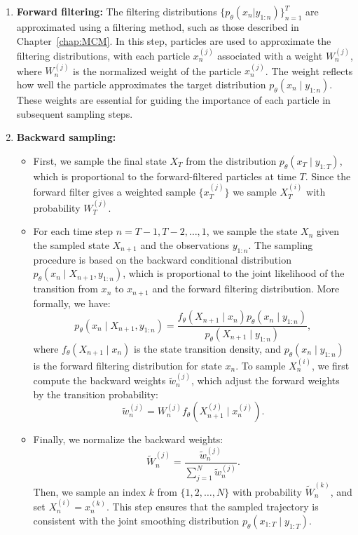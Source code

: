 \begin{enumerate}
	\item \textbf{Forward filtering:} The filtering distributions \(\{p_\theta(x_n \vert y_{1:n})\}_{n=1}^{T}\) are approximated using a filtering method, such as those described in Chapter~\ref{chap:MCM}. In this step, particles are used to approximate the filtering distributions, with each particle \(x_n^{(j)}\) associated with a weight \(W_n^{(j)}\), where \(W_n^{(j)}\) is the normalized weight of the particle \(x_n^{(j)}\). The weight reflects how well the particle approximates the target distribution \(p_\theta(x_n \mid y_{1:n})\). These weights are essential for guiding the importance of each particle in subsequent sampling steps.
	
	\item \textbf{Backward sampling:} 
	\begin{itemize}
		\item First, we sample the final state \( X_T \) from the distribution \( p_\theta(x_T \mid y_{1:T}) \), which is proportional to the forward-filtered particles at time \(T\). Since the forward filter gives a weighted sample \( \{ x_T^{(j)} \} \) we sample $X_T^{(i)}$ with probability \( W_T^{(j)} \). 
		
		\item For each time step \( n=T-1,T-2,\dots,1 \), we sample the state \( X_n \) given the sampled state \( X_{n+1} \) and the observations \( y_{1:n} \). The sampling procedure is based on the backward conditional distribution \( p_\theta(x_n \mid X_{n+1}, y_{1:n}) \), which is proportional to the joint likelihood of the transition from \( x_n \) to \( x_{n+1} \) and the forward filtering distribution. More formally, we have:
		\[
		p_\theta(x_n \mid X_{n+1}, y_{1:n}) = \frac{ f_\theta(X_{n+1} \mid x_n) p_\theta(x_n \mid y_{1:n}) }{ p_\theta(X_{n+1} \mid y_{1:n}) },
		\]
		where \( f_\theta(X_{n+1} \mid x_n) \) is the state transition density, and \( p_\theta(x_n \mid y_{1:n}) \) is the forward filtering distribution for state \( x_n \). To sample \( X_n^{(i)} \), we first compute the backward weights \( \tilde{w}_n^{(j)} \), which adjust the forward weights by the transition probability:
		\[
		\tilde{w}_n^{(j)} = W_n^{(j)} f_\theta(X_{n+1}^{(j)} \mid x_n^{(j)}).
		\]
		
		\item Finally, we normalize the backward weights:
		\[
		\tilde{W}_n^{(j)} = \frac{\tilde{w}_n^{(j)}}{\sum_{j=1}^N \tilde{w}_n^{(j)}}.
		\]
		Then, we sample an index \( k \) from \( \{1, 2, \dots, N\} \) with probability \( \tilde{W}_n^{(k)} \), and set \( X_n^{(i)} = x_n^{(k)} \). This step ensures that the sampled trajectory is consistent with the joint smoothing distribution \( p_\theta(x_{1:T} \mid y_{1:T}) \).
	\end{itemize}
\end{enumerate}
